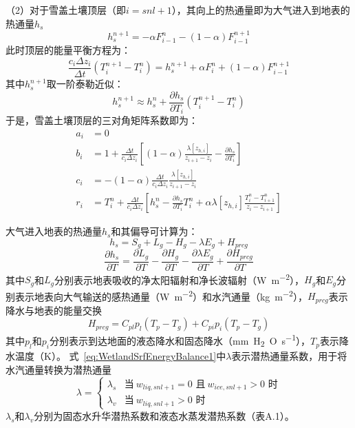 （2）对于雪盖土壤顶层（即$i=snl+1$），其向上的热通量即为大气进入到地表的热通量$h_s$
\begin{equation}
    h^{n+1}_s=-\alpha F^n_{i-1}-\left(1-\alpha\right)F^{n+1}_{i-1}
\end{equation}
此时顶层的能量平衡方程为：
\begin{equation}
    \frac{c_i\Delta z_i}{\Delta t}\left(T^{n+1}_i-T^n_i\right) = h^{n+1}_s+\alpha F^n_i+\left(1-\alpha \right)F^{n+1}_{i-1}
\end{equation}
其中$h^{n+1}_s$取一阶泰勒近似：
\begin{equation}
    h^{n+1}_s \approx h^n_s + \frac{\partial h_s}{\partial T_i}\left(T^{n+1}_i-T^n_i\right)
\end{equation}
于是，雪盖土壤顶层的三对角矩阵系数即为：
\begin{equation}
\begin{aligned}
    a_{i} &= 0 \\ 
    b_{i} &= 1+\frac{\Delta t}{c_{i} \Delta z_{i}}\left[(1-\alpha) \frac{\lambda\left[z_{h, i}\right]}{z_{i+1}-z_{i}}-\frac{\partial h_{s}}{\partial T_{i}}\right] \\
    c_{i} &= -(1-\alpha) \frac{\Delta t}{c_{i} \Delta z_{i}} \frac{\lambda\left[z_{h, i}\right]}{z_{i+1}-z_{i}} \\
    r_{i} &= T_{i}^{n}+\frac{\Delta t}{c_{i} \Delta z_{i}}\left[h_{s}^{n}-\frac{\partial h_{s}}{\partial T_{i}} T_{i}^{n}+\alpha \lambda\left[z_{h, i}\right] \frac{T_{i}^{n}-T_{i+1}^{n}}{z_{i}-z_{i+1}}\right]
\end{aligned}
\end{equation}

大气进入地表的热通量$h_s$和其偏导可计算为：
\begin{equation}\label{eq:WetlandSrfEnergyBalance1}
    h_s = S_g + L_g - H_g - \lambda E_g + H_{prcg}
\end{equation}
\begin{equation}
    \frac{\partial h_s}{\partial T} = \frac{\partial L_g}{\partial T} -\frac{\partial H_g}{\partial T} -\frac{\partial \lambda E_g}{\partial T} +\frac{\partial H_{prcg}}{\partial T}
\end{equation}
其中$S_g$和$L_g$分别表示地表吸收的净太阳辐射和净长波辐射（\unit{W.m^{-2}}），$H_g$和$E_g$分别表示地表向大气输送的感热通量（\unit{W.m^{-2}}）和水汽通量（\unit{kg.m^{-2}}），$H_{prcg}$表示降水与地表的能量交换
\begin{equation}
    H_{prcg} = C_{pl}p_l\left(T_p-T_g\right) + C_{pi}p_i\left(T_p-T_g\right)
\end{equation}
其中$p_l$和$p_i$分别表示到达地面的液态降水和固态降水（\unit{mm.H_2O.s^{-1}}），$T_p$表示降水温度（K）。
式~\eqref{eq:WetlandSrfEnergyBalance1}中$\lambda$表示潜热通量系数，用于将水汽通量转换为潜热通量
\begin{equation}
    \lambda = \begin{cases}
        \lambda_s &\text{当}\ w_{liq,snl+1}=0\text{ 且}\ w_{ice,snl+1}>0\text{ 时}\\
        \lambda_v &\text{当}\ w_{liq,snl+1}>0\text{ 时}
    \end{cases}
\end{equation}
$\lambda_s$和$\lambda_v$分别为固态水升华潜热系数和液态水蒸发潜热系数（表A.1）。

